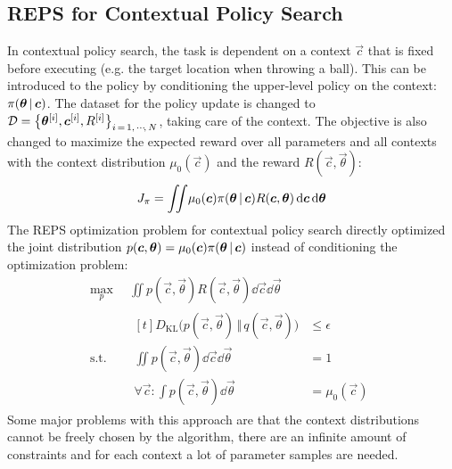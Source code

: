 		\subsection{REPS for Contextual Policy Search}
			In contextual policy search, the task is dependent on a context \(\vec{c}\) that is fixed before executing (e.g. the target location when throwing a ball). This can be introduced to the policy by conditioning the upper-level policy on the context: \( \pi(\bm{\theta} \,\vert\, \bm{c}) \). The dataset for the policy update is changed to \( \mathcal{D} = \big\{ \bm{\theta}^{[i]}, \bm{c}^{[i]}, R^{[i]} \big\}_{i \,=\, 1,\,\cdots\!,\,N} \), taking care of the context. The objective is also changed to maximize the expected reward over all parameters and all contexts with the context distribution \( \mu_0(\vec{c}) \) and the reward \( R(\vec{c}, \vec{\theta}) \):
			\begin{equation*}
				J_\pi = \iint\! \mu_0(\bm{c}) \pi(\bm{\theta} \,\vert\, \bm{c}) R(\bm{c}, \bm{\theta}) \dd{\bm{c}} \dd{\bm{\theta}}
			\end{equation*}
			The REPS optimization problem for contextual policy search directly optimized the joint distribution \( p(\bm{c}, \bm{\theta}) = \mu_0(\bm{c}) \pi(\bm{\theta} \,\vert\, \bm{c}) \) instead of conditioning the optimization problem:
			\begin{equation*}
				\begin{aligned}
					\max_p \,           & \iint\! p(\vec{c}, \vec{\theta}) R(\vec{c}, \vec{\theta}) \dd{\vec{c}} \dd{\vec{\theta}} \\
					\mathrm{s.t.} \quad &
					\begin{aligned}[t]
						D_\mathrm{KL}\big( p(\vec{c}, \vec{\theta}) \,\Vert\, q(\vec{c}, \vec{\theta}) \big) & \leq \epsilon    \\
						\iint\! p(\vec{c}, \vec{\theta}) \dd{\vec{c}} \dd{\vec{\theta}}                      & = 1              \\
						\forall \vec{c} : \int\! p(\vec{c}, \vec{\theta}) \dd{\vec{\theta}}                  & = \mu_0(\vec{c})
					\end{aligned}
				\end{aligned}
			\end{equation*}
			Some major problems with this approach are that the context distributions cannot be freely chosen by the algorithm, there are an infinite amount of constraints and for each context a lot of parameter samples are needed.


